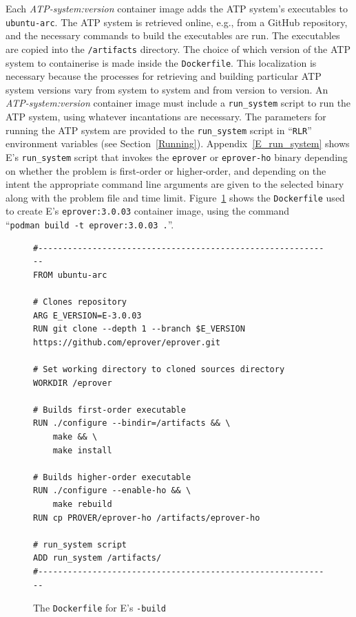 \documentclass{easychair}
\begin{document}
Each {\em ATP-system:version} container image adds the ATP system's executables to 
{\tt ubuntu-arc}.
The ATP system is retrieved online, e.g., from a GitHub repository, and the necessary commands
to build the executables are run.
The executables are copied into the {\tt /artifacts} directory.
The choice of which version of the ATP system to containerise is made inside the {\tt Dockerfile}.
This localization is necessary because the processes for retrieving and building particular 
ATP system versions vary from system to system and from version to version.
An {\em ATP-system:version} container image must include a {\tt run\_system} script to run the 
ATP system, using whatever incantations are necessary.
The parameters for running the ATP system are provided to the {\tt run\_system} script in 
``{\tt RLR}'' environment variables (see Section~\ref{Running}).
Appendix~\ref{E_run_system} shows E's {\tt run\_system} script that invokes the {\tt eprover} 
or {\tt eprover-ho} binary depending on whether the problem is first-order or higher-order, 
and depending on the intent the appropriate command line arguments are given to the selected 
binary along with the problem file and time limit. 
Figure~\ref{E---build} shows the {\tt Dockerfile} used to create E's {\tt eprover:3.0.03} 
container image, using the command ``{\tt podman~build~-t~eprover:3.0.03~.}''.

\begin{figure}[htb]
{\small
\begin{verbatim}
#------------------------------------------------------------
FROM ubuntu-arc

# Clones repository
ARG E_VERSION=E-3.0.03
RUN git clone --depth 1 --branch $E_VERSION https://github.com/eprover/eprover.git

# Set working directory to cloned sources directory
WORKDIR /eprover

# Builds first-order executable
RUN ./configure --bindir=/artifacts && \
    make && \
    make install

# Builds higher-order executable
RUN ./configure --enable-ho && \
    make rebuild
RUN cp PROVER/eprover-ho /artifacts/eprover-ho

# run_system script
ADD run_system /artifacts/
#------------------------------------------------------------
\end{verbatim}
}
\caption{The {\tt Dockerfile} for E's {\tt -build}}
\label{E---build}
\end{figure}
\end{document}
